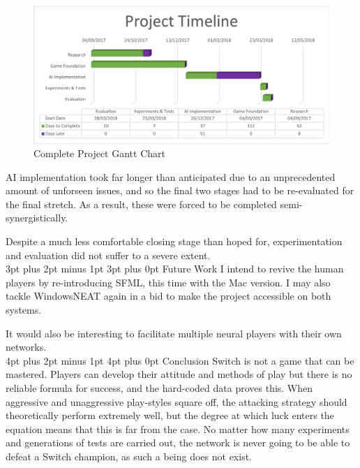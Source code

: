 \documentclass[12pt,a4paper]{article}
\makeatletter
\renewcommand\subsection{\@startsection {subsection}{1}{2mm} %
                               {3pt plus 2pt minus 1pt} %
                               {3pt plus 0pt} %
                               {\normalfont\bfseries}}
\renewcommand\section{\@startsection {section}{1}{0mm} %
                               {4pt plus 2pt minus 1pt} %
                               {4pt plus 0pt} %
                               {\bfseries}}
\makeatother
\begin{document}

\begin{figure}[h]
	\centering
	\includegraphics[width = \textwidth]{Gantt4.png}
	\caption{Complete Project Gantt Chart}
\end{figure}

AI implementation took far longer than anticipated due to an unprecedented amount of unforseen issues, and so the final two stages had to be re-evaluated for the final stretch. As a result, these were forced to be completed semi-synergistically.

Despite a much less comfortable closing stage than hoped for, experimentation and evaluation did not suffer to a severe extent.\\

\subsection{Future Work}
I intend to revive the human players by re-introducing SFML, this time with the Mac version. I may also tackle WindowsNEAT again in a bid to make the project accessible on both systems.

It would also be interesting to facilitate multiple neural players with their own networks.\\

\newpage
\section{Conclusion}
Switch is not a game that can be mastered. Players can develop their attitude and methods of play but there is no reliable formula for success, and the hard-coded data proves this. When aggressive and unaggressive play-styles square off, the attacking strategy should theoretically perform extremely well, but the degree at which luck enters the equation means that this is far from the case. No matter how many experiments and generations of tests are carried out, the network is never going to be able to defeat a Switch champion, as such a being does not exist. 
\end{document}
